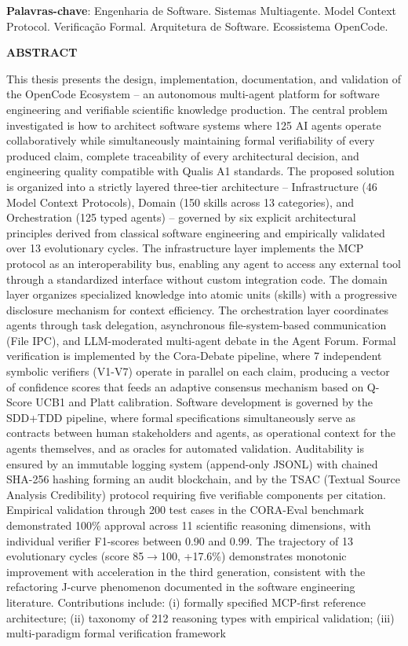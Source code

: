 \documentclass[12pt,a4paper,sumario=tradicional,openany]{abntex2}
\begin{document}
\vspace{0.5cm}
\textbf{Palavras-chave}: Engenharia de Software. Sistemas Multiagente. Model Context Protocol. Verificação Formal. Arquitetura de Software. Ecossistema OpenCode.

\newpage
\begin{center}\textbf{ABSTRACT}\end{center}

This thesis presents the design, implementation, documentation, and validation of the OpenCode Ecosystem -- an autonomous multi-agent platform for software engineering and verifiable scientific knowledge production. The central problem investigated is how to architect software systems where 125 AI agents operate collaboratively while simultaneously maintaining formal verifiability of every produced claim, complete traceability of every architectural decision, and engineering quality compatible with Qualis A1 standards. The proposed solution is organized into a strictly layered three-tier architecture -- Infrastructure (46 Model Context Protocols), Domain (150 skills across 13 categories), and Orchestration (125 typed agents) -- governed by six explicit architectural principles derived from classical software engineering and empirically validated over 13 evolutionary cycles. The infrastructure layer implements the MCP protocol as an interoperability bus, enabling any agent to access any external tool through a standardized interface without custom integration code. The domain layer organizes specialized knowledge into atomic units (skills) with a progressive disclosure mechanism for context efficiency. The orchestration layer coordinates agents through task delegation, asynchronous file-system-based communication (File IPC), and LLM-moderated multi-agent debate in the Agent Forum. Formal verification is implemented by the Cora-Debate pipeline, where 7 independent symbolic verifiers (V1-V7) operate in parallel on each claim, producing a vector of confidence scores that feeds an adaptive consensus mechanism based on Q-Score UCB1 and Platt calibration. Software development is governed by the SDD+TDD pipeline, where formal specifications simultaneously serve as contracts between human stakeholders and agents, as operational context for the agents themselves, and as oracles for automated validation. Auditability is ensured by an immutable logging system (append-only JSONL) with chained SHA-256 hashing forming an audit blockchain, and by the TSAC (Textual Source Analysis Credibility) protocol requiring five verifiable components per citation. Empirical validation through 200 test cases in the CORA-Eval benchmark demonstrated 100\% approval across 11 scientific reasoning dimensions, with individual verifier F1-scores between 0.90 and 0.99. The trajectory of 13 evolutionary cycles (score 85$\rightarrow$100, +17.6\%) demonstrates monotonic improvement with acceleration in the third generation, consistent with the refactoring J-curve phenomenon documented in the software engineering literature. Contributions include: (i) formally specified MCP-first reference architecture; (ii) taxonomy of 212 reasoning types with empirical validation; (iii) multi-paradigm formal verification framework 
\end{document}
